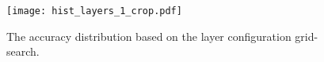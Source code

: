 \begin{figure}[h]
  \centering
  \texttt{[image: hist\_layers\_1\_crop.pdf]}
  \caption{The accuracy distribution based on the layer configuration grid-search. } %
  \label{fig:layer_performances}
\end{figure}

